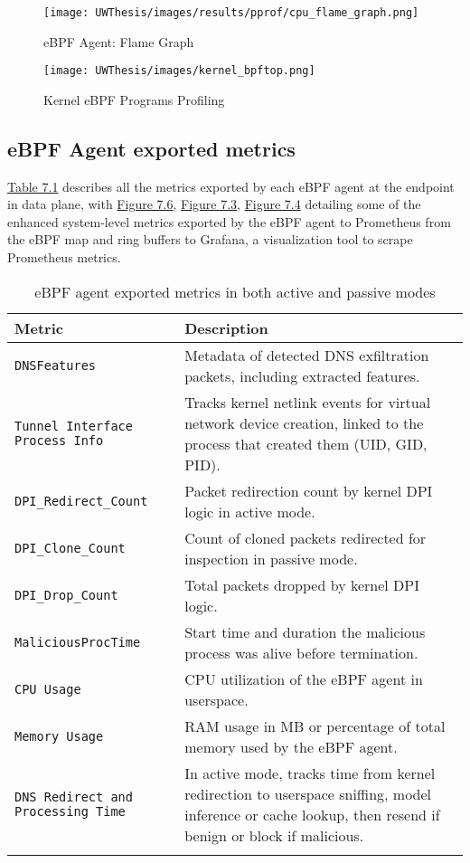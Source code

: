 \documentclass [11pt, proquest] {uwthesis}[2020/02/24]
\begin{document}
\begin{figure}[htbp]
    \centering
    \texttt{[image: UWThesis/images/results/pprof/cpu\_flame\_graph.png]}
    \caption{eBPF Agent: Flame Graph}
    \label{fig:c4}
\end{figure}

\begin{figure}[htbp]
    \centering
    \texttt{[image: UWThesis/images/kernel\_bpftop.png]}
    \caption{Kernel eBPF Programs Profiling}
    \label{fig:c3}
\end{figure}


\subsection{eBPF Agent exported metrics}
\hyperref[sec:dp_ebpf_node_metrics]{Table 7.1} describes all the metrics exported by each eBPF agent at the endpoint in data plane, with \hyperref[fig:dns-exfil-packet-metrics]{Figure 7.6}, \hyperref[fig:p1]{Figure 7.3}, \hyperref[fig:p2]{Figure 7.4}  detailing some of the enhanced system-level metrics exported by the eBPF agent to Prometheus from the eBPF map and ring buffers to Grafana, a visualization tool to scrape Prometheus metrics.

\begin{longtable}{|p{4cm}|p{10cm}|}
\hline
\textbf{Metric} & \textbf{Description} \\
\hline
\texttt{DNSFeatures} & Metadata of detected DNS exfiltration packets, including extracted features. \\
\hline
\texttt{Tunnel Interface Process Info} & Tracks kernel netlink events for virtual network device creation, linked to the process that created them (UID, GID, PID). \\
\hline
\texttt{DPI\_Redirect\_Count} & Packet redirection count by kernel DPI logic in active mode. \\
\hline
\texttt{DPI\_Clone\_Count} & Count of cloned packets redirected for inspection in passive mode. \\
\hline
\texttt{DPI\_Drop\_Count} & Total packets dropped by kernel DPI logic. \\
\hline
\texttt{MaliciousProcTime} & Start time and duration the malicious process was alive before termination. \\
\hline
\texttt{CPU Usage} & CPU utilization of the eBPF agent in userspace. \\
\hline
\texttt{Memory Usage} & RAM usage in MB or percentage of total memory used by the eBPF agent. \\
\hline
\texttt{DNS Redirect and Processing Time} & In active mode, tracks time from kernel redirection to userspace sniffing, model inference or cache lookup, then resend if benign or block if malicious. \\
\hline
\caption{eBPF agent exported metrics in both active and passive modes}
\label{sec:dp_ebpf_node_metrics}
\end{longtable}
\end{document}
